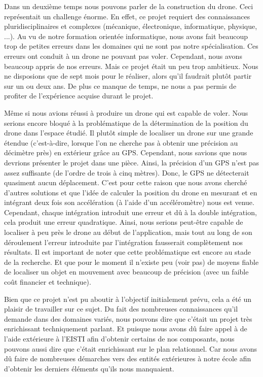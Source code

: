 \documentclass[a4paper,10pt]{report}
\begin{document}
    Dans un deuxième temps nous pouvons parler de la construction du drone. 
Ceci représentait un challenge énorme. En effet, ce projet requiert des 
connaissances pluridisciplinaires et complexes (mécanique, électronique, 
informatique, physique, ...). Au vu de notre formation orientée informatique, 
nous avons fait beaucoup trop de petites erreurs dans les domaines qui ne sont 
pas notre spécialisation. Ces erreurs ont conduit à un drone ne pouvant pas 
voler. Cependant, nous avons beaucoup appris de nos erreurs. Mais ce projet 
était un peu trop ambitieux. Nous ne disposions que de sept mois pour le 
réaliser, alors qu'il faudrait plutôt partir sur un ou deux ans. De plus ce 
manque de temps, ne nous a pas permis de profiter de l'expérience acquise 
durant le projet.

    Même si nous avions réussi à produire un drone qui est capable de voler. 
Nous serions encore bloqué à la problématique de la détermination de la 
position du drone dans l'espace étudié. Il plutôt simple de localiser un drone 
sur une grande étendue (c'est-à-dire, lorsque l'on ne cherche pas à obtenir une 
précision au décimètre près) en extérieur grâce au GPS. Cependant, nous savions 
que nous devrions présenter le projet dans une pièce. Ainsi, la précision d'un 
GPS n'est pas assez suffisante (de l'ordre de trois à cinq mètres). Donc, le 
GPS ne détecterait quasiment aucun déplacement. C'est pour cette raison que 
nous avons cherché d'autres solutions et que l'idée de calculer la position du 
drone en mesurant et en intégrant deux fois son accélération (à l'aide d'un 
accéléromètre) nous est venue. Cependant, chaque intégration introduit une 
erreur et dû à la double intégration, cela produit une erreur quadratique. 
Ainsi, nous serions peut-être capable de localiser à peu près le drone au début 
de l'application, mais tout au long de son déroulement l'erreur introduite par 
l'intégration fausserait complètement nos résultats. Il est important de noter 
que cette problématique est encore au stade de la recherche. Et que pour le 
moment il n'existe peu (voir pas) de moyens fiable de localiser un objet en 
mouvement avec beaucoup de précision (avec un faible coût financier et 
technique).

    Bien que ce projet n'est pu aboutir à l'objectif initialement prévu, cela a 
été un plaisir de travailler sur ce sujet. Du fait des nombreuses connaissances 
qu'il demande dans des domaines variés, nous pouvons dire que c'était un projet 
très enrichissant techniquement parlant. Et puisque nous avons dû faire appel à 
de l'aide extérieure à l'EISTI afin d'obtenir certains de nos composants, nous 
pouvons aussi dire que c'était enrichissant sur le plan relationnel. Car nous 
avons dû faire de nombreuses démarches vers des entités extérieures à notre 
école afin d'obtenir les derniers éléments qu'ils nous manquaient.
\end{document}
